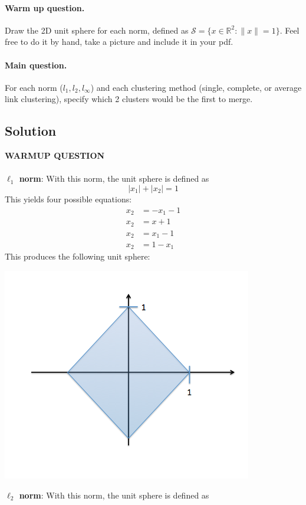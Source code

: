 \documentclass[submit]{harvardml}
\begin{document}
\begin{problem}
  \paragraph{Warm up question.} \noindent Draw the 2D unit sphere for each norm,
  defined as $\mathcal{S} = \{x \in \mathbb{R}^2: \|x\| = 1 \}$. Feel free to do
  it by hand, take a picture and include it in your pdf.

  \paragraph{Main question.}
  \noindent For each norm ($l_1, l_2, l_\infty$) and each clustering method
  (single, complete, or average link clustering), specify which 2 clusters would
  be the first to merge.
\end{problem}
\subsection*{Solution}
\textbf{WARMUP QUESTION} \\ \\
\textbf{$\ell_1$ norm}: With this norm, the unit sphere is defined as
	$$|x_1| + |x_2| = 1$$
This yields four possible equations:
	\begin{align*}
		x_2 &= -x_1 - 1 \\
		x_2 &= x + 1 \\
		x_2 &= x_1 - 1\\
		x_2 &= 1-x_1
	\end{align*}
This produces the following unit sphere:\\
	\centerline{\includegraphics[scale=0.5]{./l1}}	
\textbf{$\ell_2$ norm}: With this norm, the unit sphere is defined as 
\end{document}

